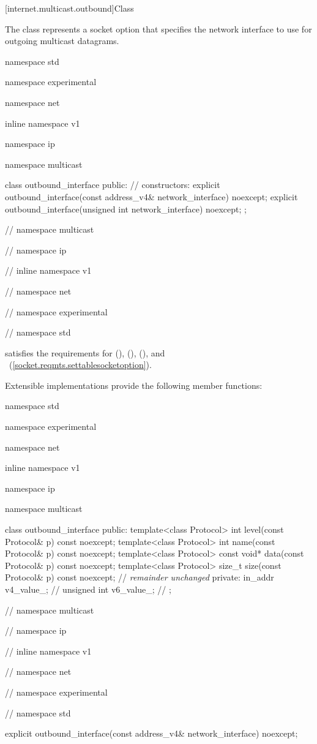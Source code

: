 %
[internet.multicast.outbound]{Class }

\pnum
The  class represents a socket option that specifies the network interface to use for outgoing multicast datagrams.

\begin{codeblock}
namespace std {
namespace experimental {
namespace net {
inline namespace v1 {
namespace ip {
namespace multicast {

  class outbound_interface
  {
  public:
    // constructors:
    explicit outbound_interface(const address_v4& network_interface) noexcept;
    explicit outbound_interface(unsigned int network_interface) noexcept;
  };

} // namespace multicast
} // namespace ip
} // inline namespace v1
} // namespace net
} // namespace experimental
} // namespace std
\end{codeblock}

\pnum
{} satisfies the requirements for  (),  (),  (), and ~(\ref{socket.reqmts.settablesocketoption}).

%
\pnum
 Extensible implementations provide the following member functions:

\begin{codeblock}
namespace std {
namespace experimental {
namespace net {
inline namespace v1 {
namespace ip {
namespace multicast {

  class outbound_interface
  {
  public:
    template<class Protocol> int level(const Protocol& p) const noexcept;
    template<class Protocol> int name(const Protocol& p) const noexcept;
    template<class Protocol> const void* data(const Protocol& p) const noexcept;
    template<class Protocol> size_t size(const Protocol& p) const noexcept;
    // \textit{remainder unchanged}
  private:
      in_addr v4_value_; // \expos
      unsigned int v6_value_; // \expos
  };

} // namespace multicast
} // namespace ip
} // inline namespace v1
} // namespace net
} // namespace experimental
} // namespace std
\end{codeblock}

\begin{itemdecl}
explicit outbound_interface(const address_v4& network_interface) noexcept;
\end{itemdecl}

